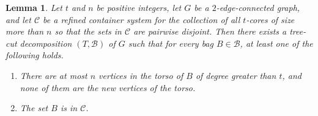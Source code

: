 \documentclass[11pt]{article}
\newtheorem{lemma}[thm]{Lemma}
\theoremstyle{definition}
\begin{document}
\begin{lemma}
\label{lem:decompFromContainers}
    Let $t$ and $n$ be positive integers, let $G$ be a $2$-edge-connected graph, and let $\mathcal{C}$ be a refined container system for the collection of all $t$-cores of size more than $n$ so that the sets in $\mathcal{C}$ are pairwise disjoint. Then there exists a tree-cut decomposition $(T, \mathscr{B})$ of $G$ such that for every bag $B \in \mathscr{B}$, at least one of the following holds.
    \begin{enumerate}
        \item\label{itm:bagType1} There are at most $n$ vertices in the torso of $B$ of degree greater than $t$, and none of them are the new vertices of the torso.
        \item\label{itm:bagType2} The set $B$ is in $\mathcal{C}$.
    \end{enumerate}
\end{lemma}
\end{document}
